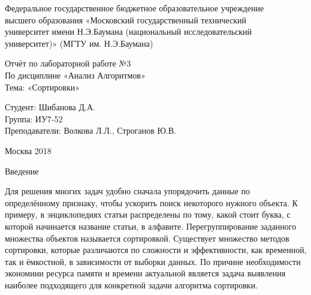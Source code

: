 \documentclass[12pt,a4paper]{scrartcl}
\begin{document}
\begin{titlepage}
\newpage
\begin{center}
Федеральное государственное бюджетное образовательное учреждение  \\
\vspace{0.25cm}%
высшего образования «Московский государственный технический  \\
\vspace{0.25cm}%
университет имени Н.Э.Баумана (национальный исследовательский \\
\vspace{0.25cm}%
университет)» (МГТУ им. Н.Э.Баумана) \\
\end{center}
\vspace{5cm}
\begin{center}
\Large Отчёт по лабораторной работе №3 \\ По дисциплине «Анализ Алгоритмов» \\ Тема: «Сортировки» %
\end{center}
\vspace{6em}
\begin{flushright}
Студент: \hrulefill Шибанова Д.А. \\
\vspace{1.5em}
Группа: \hrulefill ИУ7-52\\
\vspace{1.5em}
Преподаватели: \hrulefill Волкова Л.Л., Строганов Ю.В.\\
\vspace{1.5em}
\end{flushright}
\vspace{\fill}
\begin{center}
Москва 2018
\end{center}
\end{titlepage}
\newpage
\tableofcontents
{}
\newpage
\begin{center}
Введение
\end{center}

Для решения многих задач удобно сначала упорядочить данные по определённому признаку, чтобы ускорить поиск некоторого нужного объекта. К примеру, в энциклопедиях статьи распределены по тому, какой стоит буква, с которой начинается название статьи, в алфавите. Перегруппирование заданного множества объектов называется сортировкой. Существует множество методов сортировки, которые различаются по сложности и эффективности, как временной, так и ёмкостной, в зависимости от выборки данных. По причине необходимости экономиии ресурса памяти и времени актуальной является задача выявления наиболее подходящего для конкретной задачи алгоритма сортировки.
\end{document}
